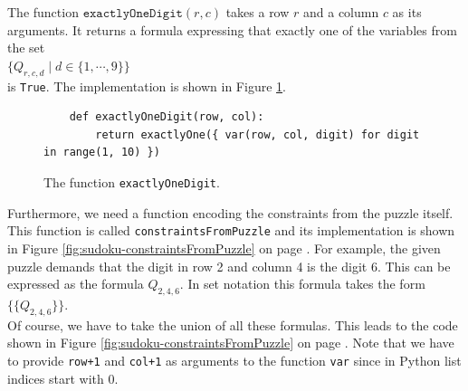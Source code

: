 The function $\texttt{exactlyOneDigit}(r, c)$ takes a row $r$ and a column $c$ as its arguments.  It returns a
formula expressing that exactly one of the variables from the set
\\[0.2cm]
\hspace*{1.3cm}
$\bigl\{ Q_{r,c,d} \mid d \in \{1,\cdots, 9\} \bigr\}$
\\[0.2cm]
is \texttt{True}. The implementation is shown in Figure \ref{fig:sudoku-exactlyOneDigit}.

\begin{figure}[!ht]
\centering
\begin{verbatim}
    def exactlyOneDigit(row, col):
        return exactlyOne({ var(row, col, digit) for digit in range(1, 10) })
\end{verbatim}
\vspace*{-0.3cm}
\caption{The function \texttt{exactlyOneDigit}.}
\label{fig:sudoku-exactlyOneDigit}
\end{figure}


Furthermore, we need a function encoding the constraints from the puzzle itself.
This function is called \texttt{constraintsFromPuzzle} and its implementation is shown in Figure
\ref{fig:sudoku-constraintsFromPuzzle} on page \pageref{fig:sudoku-constraintsFromPuzzle}.
For example, the given puzzle demands that the digit in row 2 and column 4 is the digit $6$.
This can be expressed as the formula $Q_{2,4,6}$.  In set notation this formula takes the form
\\[0.2cm]
\hspace*{1.3cm}
$\bigl\{ \{Q_{2,4,6}\} \bigr\}$.
\\[0.2cm]
Of course, we have to take the union of all these formulas.  This leads to the code shown in Figure
\ref{fig:sudoku-constraintsFromPuzzle} on page \pageref{fig:sudoku-constraintsFromPuzzle}.
Note that we have to provide \texttt{row+1} and \texttt{col+1} as arguments to the function \texttt{var} since
in Python list indices start with $0$.

